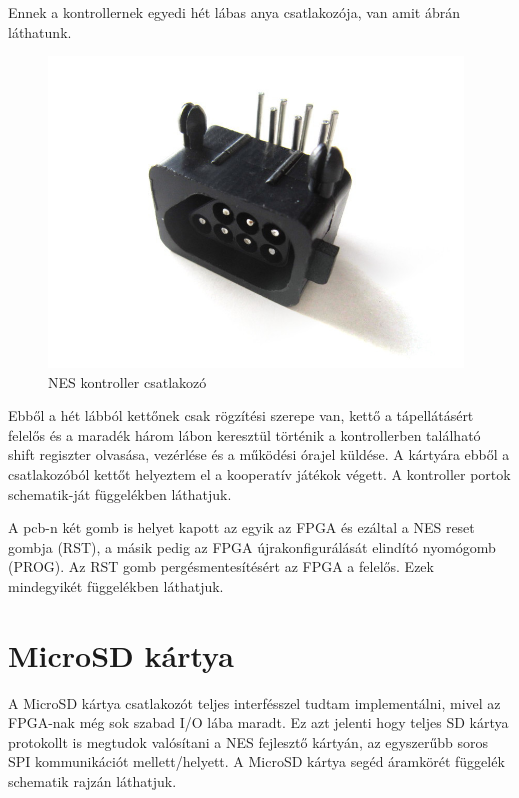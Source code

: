 	Ennek a kontrollernek egyedi hét lábas anya csatlakozója, van amit  ábrán láthatunk.   
	
	\begin{figure}[H]
		\centering
		\includegraphics[width=110mm, keepaspectratio]{figures/7pin-connector}
		\caption{NES kontroller csatlakozó}
		\label{fig:7PIN-Port}
	\end{figure}
	
	Ebből a hét lábból kettőnek csak rögzítési szerepe van, kettő a tápellátásért felelős és a maradék három lábon keresztül történik a kontrollerben található shift regiszter  olvasása, vezérlése és a működési órajel küldése. A kártyára ebből a csatlakozóból kettőt helyeztem el a kooperatív játékok végett. A kontroller portok schematik-ját  függelékben láthatjuk.
	
	A pcb-n két gomb is helyet kapott az egyik az FPGA és ezáltal a NES reset gombja (RST), a másik pedig az FPGA újrakonfigurálását elindító nyomógomb (PROG). Az RST gomb pergésmentesítésért az FPGA a felelős. Ezek mindegyikét  függelékben láthatjuk. 
	
\section{MicroSD kártya}
	
	A MicroSD kártya csatlakozót teljes interfésszel tudtam implementálni, mivel az FPGA-nak még sok szabad I/O lába maradt. Ez azt jelenti hogy teljes SD kártya protokollt is megtudok valósítani a NES fejlesztő kártyán, az egyszerűbb soros SPI kommunikációt mellett/helyett. A MicroSD kártya segéd áramkörét  függelék schematik rajzán láthatjuk. 
	
